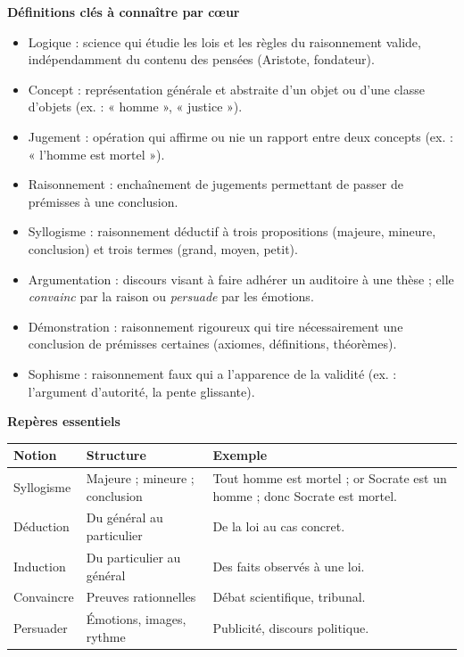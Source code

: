 \documentclass[11pt]{article}
\newcommand{\cle}[1]{{\popxbold\color{popdark}#1}}
\begin{document}
\begin{bilan}
\textbf{Définitions clés à connaître par cœur}
\begin{itemize}
\item \cle{Logique} : science qui étudie les lois et les règles du raisonnement valide, indépendamment du contenu des pensées (Aristote, fondateur).
\item \cle{Concept} : représentation générale et abstraite d'un objet ou d'une classe d'objets (ex. : « homme », « justice »).
\item \cle{Jugement} : opération qui affirme ou nie un rapport entre deux concepts (ex. : « l'homme est mortel »).
\item \cle{Raisonnement} : enchaînement de jugements permettant de passer de prémisses à une conclusion.
\item \cle{Syllogisme} : raisonnement déductif à trois propositions (majeure, mineure, conclusion) et trois termes (grand, moyen, petit).
\item \cle{Argumentation} : discours visant à faire adhérer un auditoire à une thèse ; elle \emph{convainc} par la raison ou \emph{persuade} par les émotions.
\item \cle{Démonstration} : raisonnement rigoureux qui tire nécessairement une conclusion de prémisses certaines (axiomes, définitions, théorèmes).
\item \cle{Sophisme} : raisonnement faux qui a l'apparence de la validité (ex. : l'argument d'autorité, la pente glissante).
\end{itemize}

\textbf{Repères essentiels}
\begin{center}
\begin{tabularx}{\linewidth}{|l|X|X|}
\hline
\rowcolor{popblueL} \textbf{Notion} & \textbf{Structure} & \textbf{Exemple} \\
\hline
Syllogisme & Majeure ; mineure ; conclusion & Tout homme est mortel ; or Socrate est un homme ; donc Socrate est mortel. \\
\hline
Déduction & Du général au particulier & De la loi au cas concret. \\
\hline
Induction & Du particulier au général & Des faits observés à une loi. \\
\hline
Convaincre & Preuves rationnelles & Débat scientifique, tribunal. \\
\hline
Persuader & Émotions, images, rythme & Publicité, discours politique. \\
\hline
\end{tabularx}
\end{center}


\end{bilan}
\end{document}
